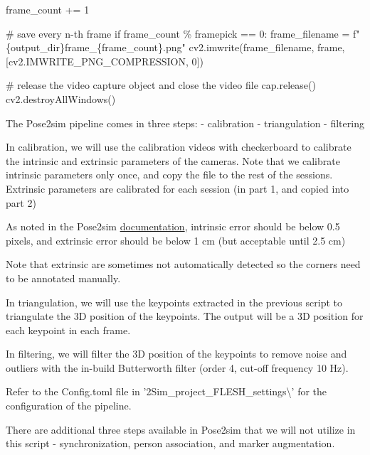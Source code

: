 \documentclass[
  letterpaper,
  DIV=11,
  numbers=noendperiod]{scrreprt}
\newenvironment{Shaded}{\begin{snugshade}}{\end{snugshade}}
\newcommand{\CommentTok}[1]{\textcolor[rgb]{0.37,0.37,0.37}{#1}}
\newcommand{\ControlFlowTok}[1]{\textcolor[rgb]{0.00,0.23,0.31}{#1}}
\newcommand{\DecValTok}[1]{\textcolor[rgb]{0.68,0.00,0.00}{#1}}
\newcommand{\NormalTok}[1]{\textcolor[rgb]{0.00,0.23,0.31}{#1}}
\newcommand{\OperatorTok}[1]{\textcolor[rgb]{0.37,0.37,0.37}{#1}}
\newcommand{\SpecialCharTok}[1]{\textcolor[rgb]{0.37,0.37,0.37}{#1}}
\newcommand{\SpecialStringTok}[1]{\textcolor[rgb]{0.13,0.47,0.30}{#1}}
\begin{document}
\begin{Shaded}
\begin{Highlighting}[]
\NormalTok{        frame\_count }\OperatorTok{+=} \DecValTok{1}

        \CommentTok{\# save every n{-}th frame}
        \ControlFlowTok{if}\NormalTok{ frame\_count }\OperatorTok{\%}\NormalTok{ framepick }\OperatorTok{==} \DecValTok{0}\NormalTok{:}
\NormalTok{            frame\_filename }\OperatorTok{=} \SpecialStringTok{f"}\SpecialCharTok{\{}\NormalTok{output\_dir}\SpecialCharTok{\}}\SpecialStringTok{frame\_}\SpecialCharTok{\{}\NormalTok{frame\_count}\SpecialCharTok{\}}\SpecialStringTok{.png"}
\NormalTok{            cv2.imwrite(frame\_filename, frame, [cv2.IMWRITE\_PNG\_COMPRESSION, }\DecValTok{0}\NormalTok{])}

    \CommentTok{\# release the video capture object and close the video file}
\NormalTok{    cap.release()}
\NormalTok{    cv2.destroyAllWindows()}
\end{Highlighting}
\end{Shaded}

The Pose2sim pipeline comes in three steps: - calibration -
triangulation - filtering

In calibration, we will use the calibration videos with checkerboard to
calibrate the intrinsic and extrinsic parameters of the cameras. Note
that we calibrate intrinsic parameters only once, and copy the file to
the rest of the sessions. Extrinsic parameters are calibrated for each
session (in part 1, and copied into part 2)

As noted in the Pose2sim
\href{https://github.com/perfanalytics/pose2sim?tab=readme-ov-file\#camera-calibration}{documentation},
intrinsic error should be below 0.5 pixels, and extrinsic error should
be below 1 cm (but acceptable until 2.5 cm)

Note that extrinsic are sometimes not automatically detected so the
corners need to be annotated manually.

In triangulation, we will use the keypoints extracted in the previous
script to triangulate the 3D position of the keypoints. The output will
be a 3D position for each keypoint in each frame.

In filtering, we will filter the 3D position of the keypoints to remove
noise and outliers with the in-build Butterworth filter (order 4,
cut-off frequency 10 Hz).

Refer to the Config.toml file in
'\Pose2Sim\Empty\_project\_FLESH\_settings\textbackslash' for the
configuration of the pipeline.

There are additional three steps available in Pose2sim that we will not
utilize in this script - synchronization, person association, and marker
augmentation.
\end{document}
